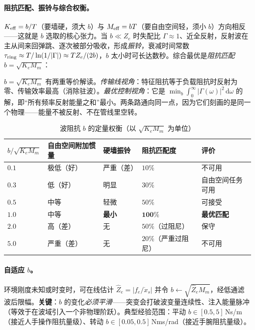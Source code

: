\paragraph{阻抗匹配、振铃与综合权衡。}
$K_{\rm eff}=b/T$（要墙硬，须大 $b$）与 $M_{\rm eff}=bT$（要自由空间轻，须小 $b$）方向相反——这就是 $b$ 选取的核心张力。当 $b\ll Z_e$ 时失配比 $\Gamma\approx1$、近全反射，反射波在主从间来回弹跳、逐次被部分吸收，形成\emph{振铃}，衰减时间常数 $\tau_{\rm ring}\approx T/\ln(1/|\Gamma|)\approx TZ_e/(2b)$，$b$ 太小时可长达数秒。综合最优是\emph{阻抗匹配} $b=\sqrt{K_eM_m}$：

\begin{insight}
$b=\sqrt{K_eM_m}$ 有两重等价解读。\emph{传输线视角}：特征阻抗等于负载阻抗时反射为零、传输效率最高（消除驻波）。\emph{最优控制视角}：它是 $\min_b\int_0^\infty|\Gamma(\omega)|^2\,\mathrm d\omega$ 的解，即“所有频率反射能量之和”最小。两条路通向同一点，因为它们刻画的是同一个物理——能量不被反射、不在管线里空转。
\end{insight}

\begin{table}[H]\centering\small
\caption{波阻抗 $b$ 的定量权衡（以 $\sqrt{K_eM_m}$ 为单位）}
\label{tab:tw-b-tradeoff}
\begin{tabular}{lllll}
\toprule
$b/\sqrt{K_eM_m}$ & 自由空间附加惯量 & 硬墙振铃 & 阻抗匹配度 & 评价 \\
\midrule
$0.1$ & 极低（好） & 严重（差） & $10\%$ & 不可用 \\
$0.3$ & 低（好） & 明显 & $30\%$ & 自由空间任务可用 \\
$0.5$ & 中等 & 轻微 & $50\%$ & 可接受 \\
$\mathbf{1.0}$ & 中等 & \textbf{最小} & $\mathbf{100\%}$ & \textbf{最优匹配} \\
$2.0$ & 高（差） & 无 & $50\%$（过阻尼） & 保守 \\
$5.0$ & 严重（差） & 无 & $20\%$（严重过阻尼） & 不可用 \\
\bottomrule
\end{tabular}
\end{table}

\paragraph{自适应 $b$。}
环境刚度未知或时变时，可在线估计 $\hat Z_e=|f_e/\dot x_s|$ 并令 $b\!\leftarrow\!\sqrt{\hat Z_e M_m}$，经低通滤波后限幅。\textbf{关键}：$b$ 的变化\emph{必须平滑}——突变会打破波变量连续性、注入能量脉冲（等效于在波域引入一个非物理阶跃）。典型经验范围：平动 $b\in[0.5,5]\,$Ns/m（接近人手操作阻抗量级）、转动 $b\in[0.05,0.5]\,$Nms/rad（接近手腕阻抗量级）。

